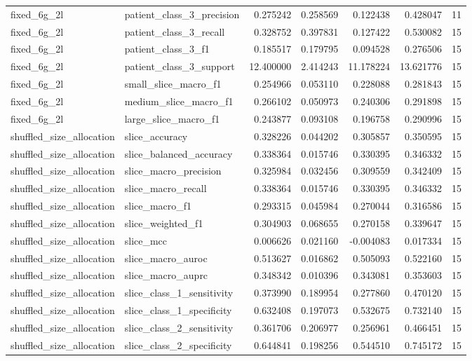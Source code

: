\begin{tabular}{llrrrrr}
fixed_6g_2l & patient_class_3_precision & 0.275242 & 0.258569 & 0.122438 & 0.428047 & 11 \\
fixed_6g_2l & patient_class_3_recall & 0.328752 & 0.397831 & 0.127422 & 0.530082 & 15 \\
fixed_6g_2l & patient_class_3_f1 & 0.185517 & 0.179795 & 0.094528 & 0.276506 & 15 \\
fixed_6g_2l & patient_class_3_support & 12.400000 & 2.414243 & 11.178224 & 13.621776 & 15 \\
fixed_6g_2l & small_slice_macro_f1 & 0.254966 & 0.053110 & 0.228088 & 0.281843 & 15 \\
fixed_6g_2l & medium_slice_macro_f1 & 0.266102 & 0.050973 & 0.240306 & 0.291898 & 15 \\
fixed_6g_2l & large_slice_macro_f1 & 0.243877 & 0.093108 & 0.196758 & 0.290996 & 15 \\
shuffled_size_allocation & slice_accuracy & 0.328226 & 0.044202 & 0.305857 & 0.350595 & 15 \\
shuffled_size_allocation & slice_balanced_accuracy & 0.338364 & 0.015746 & 0.330395 & 0.346332 & 15 \\
shuffled_size_allocation & slice_macro_precision & 0.325984 & 0.032456 & 0.309559 & 0.342409 & 15 \\
shuffled_size_allocation & slice_macro_recall & 0.338364 & 0.015746 & 0.330395 & 0.346332 & 15 \\
shuffled_size_allocation & slice_macro_f1 & 0.293315 & 0.045984 & 0.270044 & 0.316586 & 15 \\
shuffled_size_allocation & slice_weighted_f1 & 0.304903 & 0.068655 & 0.270158 & 0.339647 & 15 \\
shuffled_size_allocation & slice_mcc & 0.006626 & 0.021160 & -0.004083 & 0.017334 & 15 \\
shuffled_size_allocation & slice_macro_auroc & 0.513627 & 0.016862 & 0.505093 & 0.522160 & 15 \\
shuffled_size_allocation & slice_macro_auprc & 0.348342 & 0.010396 & 0.343081 & 0.353603 & 15 \\
shuffled_size_allocation & slice_class_1_sensitivity & 0.373990 & 0.189954 & 0.277860 & 0.470120 & 15 \\
shuffled_size_allocation & slice_class_1_specificity & 0.632408 & 0.197073 & 0.532675 & 0.732140 & 15 \\
shuffled_size_allocation & slice_class_2_sensitivity & 0.361706 & 0.206977 & 0.256961 & 0.466451 & 15 \\
shuffled_size_allocation & slice_class_2_specificity & 0.644841 & 0.198256 & 0.544510 & 0.745172 & 15 \\

\end{tabular}
